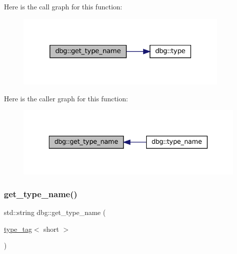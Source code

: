 Here is the call graph for this function\+:
\nopagebreak
\begin{figure}[H]
\begin{center}
\leavevmode
\includegraphics[width=294pt]{namespacedbg_a20edc7ca4e92e4b3bddc6b983384aa00_cgraph}
\end{center}
\end{figure}
Here is the caller graph for this function\+:
\nopagebreak
\begin{figure}[H]
\begin{center}
\leavevmode
\includegraphics[width=327pt]{namespacedbg_a20edc7ca4e92e4b3bddc6b983384aa00_icgraph}
\end{center}
\end{figure}
\mbox{\label{namespacedbg_a77b693006b8b158eb9a4604fba56a782}} 
\subsubsection{\texorpdfstring{get\+\_\+type\+\_\+name()}{get\_type\_name()}\hspace{0.1cm}{\footnotesize\ttfamily [2/10]}}
{\footnotesize\ttfamily std\+::string dbg\+::get\+\_\+type\+\_\+name (\begin{DoxyParamCaption}\item[{\hyperlink{structdbg_1_1type__tag}{type\+\_\+tag}$<$ short $>$}]{ }\end{DoxyParamCaption})\hspace{0.3cm}{\ttfamily [inline]}}

\mbox{\label{namespacedbg_ae70efee8c9a9d398975f71b216602097}} 
